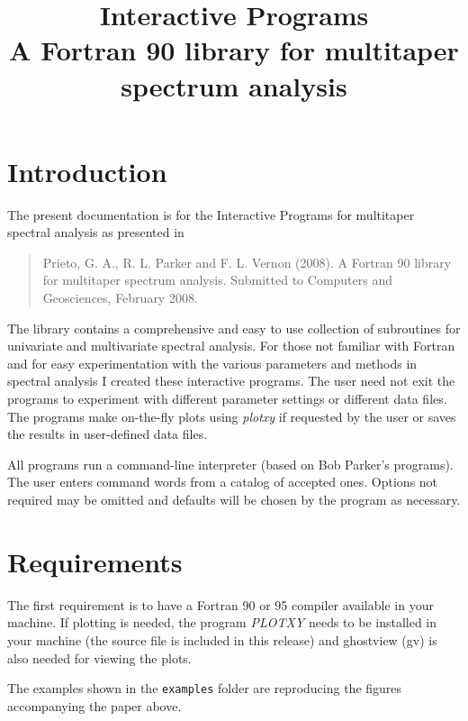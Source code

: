 \documentclass{article}
\title{Interactive Programs \\
	{\normalsize A Fortran 90 library for multitaper spectrum analysis}}
\date{}
\begin{document}

\maketitle

\section{Introduction}

The present documentation is for the Interactive Programs for multitaper spectral analysis as presented in 
\begin{quotation}
Prieto, G. A., R. L. Parker and F. L. Vernon (2008). A Fortran 90 library for multitaper spectrum analysis. Submitted to Computers and Geosciences, February 2008.
\end{quotation}
The library contains a comprehensive and easy to use collection of subroutines for univariate and multivariate spectral analysis. For those not familiar with Fortran and for easy experimentation with the various parameters and methods in spectral analysis I created these interactive programs. The user need not exit the programs to experiment with different parameter settings or different data files. The programs make on-the-fly plots using {\it plotxy} if requested by the user or saves the results in user-defined data files.

All programs run a command-line interpreter (based on Bob Parker's programs). The user enters command words from a catalog of accepted ones. Options not required may be omitted and defaults will be chosen by the program as necessary.  

\section{Requirements}
The first requirement is to have a Fortran 90 or 95 compiler available in your machine. If plotting is needed, the program {\it PLOTXY} needs to be installed in your machine (the source file is included in this release) and ghostview (gv) is also needed for viewing the plots. 

The examples shown in the \texttt{examples} folder are reproducing the figures accompanying the paper above. 
\end{document}
